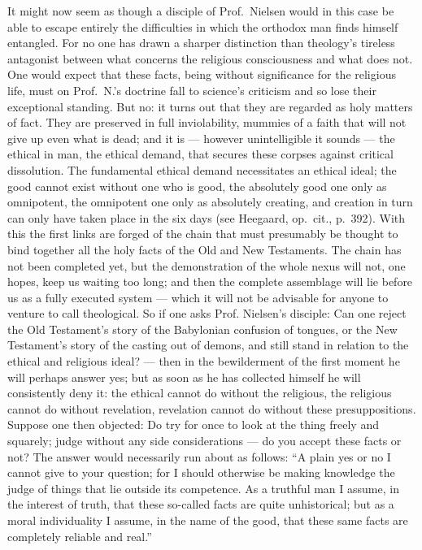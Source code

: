 \documentclass[12pt,a4paper]{book}
\newcommand{\opage}[1]{\marginnote{\footnotesize\textit{[#1]}}}
\begin{document}
It might now seem as though a disciple of
\opage{22}Prof.\ Nielsen would in this case be able to escape entirely the
difficulties in which the orthodox man finds himself entangled. For no one has
drawn a sharper distinction than theology's tireless antagonist between what
concerns the religious consciousness and what does not. One would expect that
these facts, being without significance for the religious life, must on Prof.\
N.'s doctrine fall to science's criticism and so lose their exceptional
standing. But no: it turns out that they are regarded as holy matters of fact.
They are preserved in full inviolability, mummies of a faith that will not give
up even what is dead; and it is --- however unintelligible it sounds --- the
ethical in man, the ethical demand, that secures these corpses against critical
dissolution. The fundamental ethical demand necessitates an ethical ideal; the
good cannot exist without one who is good, the absolutely good one only as
omnipotent, the omnipotent one only as absolutely creating, and creation in
turn can only have taken place in the six days (see Heegaard, op.\ cit., p.\
392). With this the first links are forged of the chain that must presumably be
thought to bind together all the holy facts of the Old and New Testaments. The
chain has not been completed yet, but the demonstration of the whole nexus will
not, one hopes, keep us waiting too long; and then the complete assemblage will
lie before us as a fully executed system --- which it will not be advisable for
anyone to venture to call theological. So if one asks Prof.
\opage{23}Nielsen's disciple: Can one reject the Old Testament's story of the
Babylonian confusion of tongues, or the New Testament's story of the casting
out of demons, and still stand in relation to the ethical and religious ideal?
--- then in the bewilderment of the first moment he will perhaps answer yes;
but as soon as he has collected himself he will consistently deny it: the
ethical cannot do without the religious, the religious cannot do without
revelation, revelation cannot do without these presuppositions. Suppose one
then objected: Do try for once to look at the thing freely and squarely; judge
without any side considerations --- do you accept these facts or not? The
answer would necessarily run about as follows: ``A plain yes or no I cannot
give to your question; for I should otherwise be making knowledge the judge of
things that lie outside its competence. As a truthful man I assume, in the
interest of truth, that these so-called facts are quite unhistorical; but as a
moral individuality I assume, in the name of the good, that these same facts
are completely reliable and real.''
\end{document}

